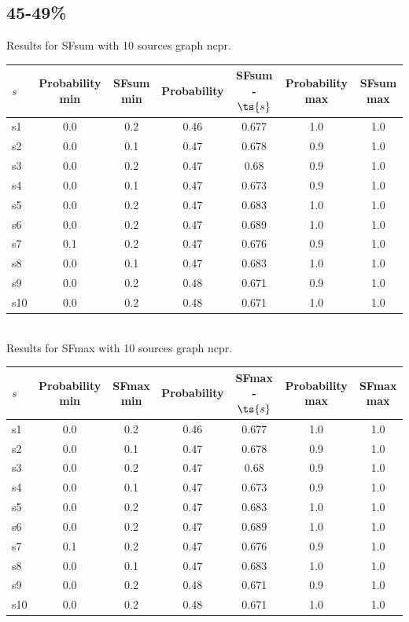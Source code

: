 \documentclass{article}
\begin{document}
\newpage

\subsection{45-49\%}

\noindent Results for SFsum with 10 sources graph ncpr.

\noindent\begin{tabular}{|l|c|c|c|c|c|c|}
\hline
$s$& Probability min & SFsum min & Probability & SFsum - $\ts{s}$ & Probability max & SFsum max\\
\hline
s1 &0.0 & 0.2 & 0.46 & 0.677 & 1.0 & 1.0\\
\hline
s2 &0.0 & 0.1 & 0.47 & 0.678 & 0.9 & 1.0\\
\hline
s3 &0.0 & 0.2 & 0.47 & 0.68 & 0.9 & 1.0\\
\hline
s4 &0.0 & 0.1 & 0.47 & 0.673 & 0.9 & 1.0\\
\hline
s5 &0.0 & 0.2 & 0.47 & 0.683 & 1.0 & 1.0\\
\hline
s6 &0.0 & 0.2 & 0.47 & 0.689 & 1.0 & 1.0\\
\hline
s7 &0.1 & 0.2 & 0.47 & 0.676 & 0.9 & 1.0\\
\hline
s8 &0.0 & 0.1 & 0.47 & 0.683 & 1.0 & 1.0\\
\hline
s9 &0.0 & 0.2 & 0.48 & 0.671 & 0.9 & 1.0\\
\hline
s10 &0.0 & 0.2 & 0.48 & 0.671 & 1.0 & 1.0\\
\hline
\end{tabular}\\

\noindent Results for SFmax with 10 sources graph ncpr.

\noindent\begin{tabular}{|l|c|c|c|c|c|c|}
\hline
$s$& Probability min & SFmax min & Probability & SFmax - $\ts{s}$ & Probability max & SFmax max\\
\hline
s1 &0.0 & 0.2 & 0.46 & 0.677 & 1.0 & 1.0\\
\hline
s2 &0.0 & 0.1 & 0.47 & 0.678 & 0.9 & 1.0\\
\hline
s3 &0.0 & 0.2 & 0.47 & 0.68 & 0.9 & 1.0\\
\hline
s4 &0.0 & 0.1 & 0.47 & 0.673 & 0.9 & 1.0\\
\hline
s5 &0.0 & 0.2 & 0.47 & 0.683 & 1.0 & 1.0\\
\hline
s6 &0.0 & 0.2 & 0.47 & 0.689 & 1.0 & 1.0\\
\hline
s7 &0.1 & 0.2 & 0.47 & 0.676 & 0.9 & 1.0\\
\hline
s8 &0.0 & 0.1 & 0.47 & 0.683 & 1.0 & 1.0\\
\hline
s9 &0.0 & 0.2 & 0.48 & 0.671 & 0.9 & 1.0\\
\hline
s10 &0.0 & 0.2 & 0.48 & 0.671 & 1.0 & 1.0\\
\hline
\end{tabular}\\
\end{document}
